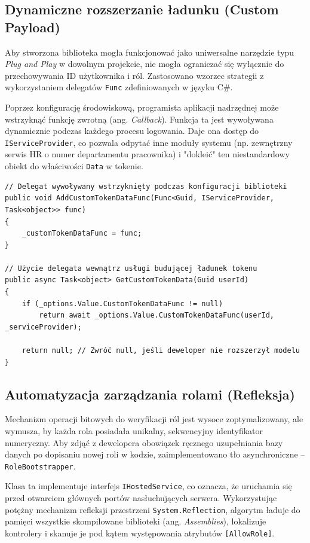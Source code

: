\documentclass{SGGW-thesis}
\begin{document}
\subsection{Dynamiczne rozszerzanie ładunku (Custom Payload)}

Aby stworzona biblioteka mogła funkcjonować jako uniwersalne narzędzie typu \textit{Plug and Play} w dowolnym projekcie, nie mogła ograniczać się wyłącznie do przechowywania ID użytkownika i ról. Zastosowano wzorzec strategii z wykorzystaniem delegatów \texttt{Func} zdefiniowanych w języku C\#. 

Poprzez konfigurację środowiskową, programista aplikacji nadrzędnej może wstrzyknąć funkcję zwrotną (ang. \textit{Callback}). Funkcja ta jest wywoływana dynamicznie podczas każdego procesu logowania. Daje ona dostęp do \texttt{IServiceProvider}, co pozwala odpytać inne moduły systemu (np. zewnętrzny serwis HR o numer departamentu pracownika) i "dokleić" ten niestandardowy obiekt do właściwości \texttt{Data} w tokenie.

\begin{verbatim}
// Delegat wywoływany wstrzyknięty podczas konfiguracji biblioteki
public void AddCustomTokenDataFunc(Func<Guid, IServiceProvider, Task<object>> func)
{
    _customTokenDataFunc = func;
}

// Użycie delegata wewnątrz usługi budującej ładunek tokenu
public async Task<object> GetCustomTokenData(Guid userId)
{
    if (_options.Value.CustomTokenDataFunc != null)
        return await _options.Value.CustomTokenDataFunc(userId, _serviceProvider);
        
    return null; // Zwróć null, jeśli deweloper nie rozszerzył modelu
}
\end{verbatim}

\clearpage

\subsection{Automatyzacja zarządzania rolami (Refleksja)}

Mechanizm operacji bitowych do weryfikacji ról jest wysoce zoptymalizowany, ale wymusza, by każda rola posiadała unikalny, sekwencyjny identyfikator numeryczny. Aby zdjąć z dewelopera obowiązek ręcznego uzupełniania bazy danych po dopisaniu nowej roli w kodzie, zaimplementowano tło asynchroniczne – \texttt{RoleBootstrapper}. 

Klasa ta implementuje interfejs \texttt{IHostedService}, co oznacza, że uruchamia się przed otwarciem głównych portów nasłuchujących serwera. Wykorzystując potężny mechanizm refleksji przestrzeni \texttt{System.Reflection}, algorytm ładuje do pamięci wszystkie skompilowane biblioteki (ang. \textit{Assemblies}), lokalizuje kontrolery i skanuje je pod kątem występowania atrybutów \texttt{[AllowRole]}.
\end{document}
